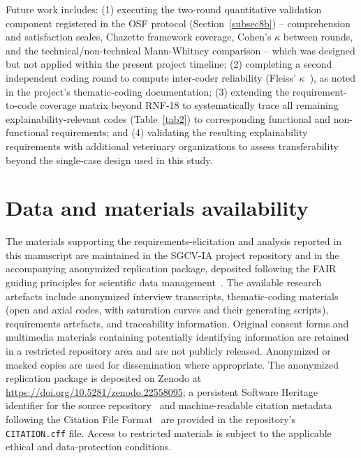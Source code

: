 \documentclass[pdflatex,sn-mathphys-num,Numbered]{sn-jnl}
\begin{document}
Future work includes: (1) executing the two-round quantitative validation component registered in the OSF protocol (Section~\ref{subsec8b}) -- comprehension and satisfaction scales, Chazette framework coverage, Cohen's $\kappa$ between rounds, and the technical/non-technical Mann-Whitney comparison -- which was designed but not applied within the present project timeline; (2) completing a second independent coding round to compute inter-coder reliability (Fleiss' $\kappa$~\cite{fleiss1971}), as noted in the project's thematic-coding documentation; (3) extending the requirement-to-code coverage matrix beyond RNF-18 to systematically trace all remaining explainability-relevant codes (Table~\ref{tab2}) to corresponding functional and non-functional requirements; and (4) validating the resulting explainability requirements with additional veterinary organizations to assess transferability beyond the single-case design used in this study.


\backmatter

\section*{Data and materials availability}
The materials supporting the requirements-elicitation and analysis reported in this manuscript are maintained in the SGCV-IA project repository and in the accompanying anonymized replication package, deposited following the FAIR guiding principles for scientific data management~\cite{wilkinson2016,fairdata2020}. The available research artefacts include anonymized interview transcripts, thematic-coding materials (open and axial codes, with saturation curves and their generating scripts), requirements artefacts, and traceability information. Original consent forms and multimedia materials containing potentially identifying information are retained in a restricted repository area and are not publicly released. Anonymized or masked copies are used for dissemination where appropriate. The anonymized replication package is deposited on Zenodo at \url{https://doi.org/10.5281/zenodo.22558095}; a persistent Software Heritage identifier for the source repository~\cite{dicosmo2017,dicosmo2020} and machine-readable citation metadata following the Citation File Format~\cite{druskat2021,smith2016} are provided in the repository's \texttt{CITATION.cff} file. Access to restricted materials is subject to the applicable ethical and data-protection conditions.
\end{document}
